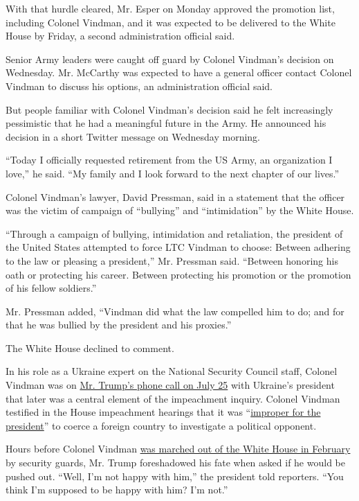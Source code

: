 With that hurdle cleared, Mr. Esper on Monday approved the promotion
list, including Colonel Vindman, and it was expected to be delivered to
the White House by Friday, a second administration official said.

Senior Army leaders were caught off guard by Colonel Vindman's decision
on Wednesday. Mr. McCarthy was expected to have a general officer
contact Colonel Vindman to discuss his options, an administration
official said.

But people familiar with Colonel Vindman's decision said he felt
increasingly pessimistic that he had a meaningful future in the Army. He
announced his decision in a short Twitter message on Wednesday morning.

``Today I officially requested retirement from the US Army, an
organization I love,'' he said. ``My family and I look forward to the
next chapter of our lives.''

Colonel Vindman's lawyer, David Pressman, said in a statement that the
officer was the victim of campaign of ``bullying'' and ``intimidation''
by the White House.

``Through a campaign of bullying, intimidation and retaliation, the
president of the United States attempted to force LTC Vindman to choose:
Between adhering to the law or pleasing a president,'' Mr. Pressman
said. ``Between honoring his oath or protecting his career. Between
protecting his promotion or the promotion of his fellow soldiers.''

Mr. Pressman added, ``Vindman did what the law compelled him to do; and
for that he was bullied by the president and his proxies.''

The White House declined to comment.

In his role as a Ukraine expert on the National Security Council staff,
Colonel Vindman was on
\href{https://www.nytimes.com/interactive/2019/09/25/us/politics/trump-ukraine-transcript.html}{Mr.
Trump's phone call on July 25} with Ukraine's president that later was a
central element of the impeachment inquiry. Colonel Vindman testified in
the House impeachment hearings that it was
``\href{https://www.nytimes.com/2019/11/19/us/politics/impeachment-hearings.html}{improper
for the president}'' to coerce a foreign country to investigate a
political opponent.

Hours before Colonel Vindman
\href{https://www.nytimes.com/2020/02/07/us/politics/alexander-vindman-gordon-sondland-fired.html}{was
marched out of the White House in February} by security guards, Mr.
Trump foreshadowed his fate when asked if he would be pushed out.
``Well, I'm not happy with him,'' the president told reporters. ``You
think I'm supposed to be happy with him? I'm not.''

